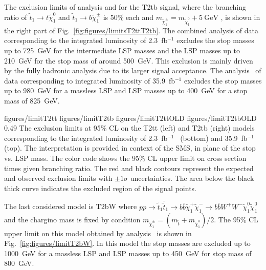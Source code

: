 The exclusion limits of analysis \cite{Sirunyan:2016jpr} and  \cite{Sirunyan:2017xse} for the T2tb signal, where the branching ratio of $ \tilde{t}_{1} \to t  \tilde{\chi}^{0}_{1} $ and $ \tilde{t}_{1} \to b  \tilde{\chi}^{\pm}_{1} $  is 50\% each and $m_{\tilde{\chi}_{1}^{\pm}} = m_{\tilde{\chi}_{1}^{0}} + 5~\mathrm{GeV}$ , is shown in the right part of Fig.~\ref{fig:figures/limitsT2ttT2tb}. The combined analysis of data corresponding to the integrated luminosity of 2.3~fb$^{-1}$ excludes the stop masses up to 725~GeV for the intermediate LSP masses and the LSP masses up to 210~GeV for the stop mass of around 500~GeV. This exclusion is mainly driven by the fully hadronic analysis due to its larger signal acceptance. The analysis~\cite{Sirunyan:2017xse} of data corresponding to integrated luminosity of 35.9~fb$^{-1}$ excludes the stop masses up to 980~GeV for a massless LSP and LSP masses up to 400~GeV for a stop mass of 825~GeV. 

                 {figures/limitT2tt} %
                 {figures/limitT2tb} %
                 {figures/limitT2ttOLD} %
                 {figures/limitT2tbOLD} %
                 {0.49}       %
                 { The exclusion limits at 95\% CL on the T2tt (left) and T2tb (right) models corresponding to the integrated luminosity of 2.3~fb$^{-1}$~\cite{Sirunyan:2016jpr} (bottom) and   35.9~fb$^{-1}$ ~\cite{Sirunyan:2017xse} (top). The interpretation is provided in context of the SMS, in plane of the stop vs. LSP mass. The color code shows the 95\% CL upper limit on cross section times given branching ratio. The red and black contours represent the expected and observed exclusion limits with $\pm 1 \sigma$ uncertainties. The area below the black thick curve indicates the excluded region of the signal points.  }

The last considered model is T2bW where $ pp \to \tilde{t}_{1} \bar{\tilde{t}}_{1} \to b \bar{b} \tilde{\chi}^{+}_{1} \tilde{\chi}^{-}_{1} \to b \bar{b} W^{+} W^{-} \tilde{\chi}^{0}_{1} \tilde{\chi}^{0}_{1}$ and the chargino mass is fixed by condition $m_{\tilde{\chi}_{1}^{\pm}} = ( m_{\tilde{t}} +  m_{\tilde{\chi}_{1}^{0}} )/2$. The 95\% CL upper limit on this model obtained by analysis~\cite{Sirunyan:2017xse} is shown in Fig.~\ref{fig:figures/limitT2bW}. In this model the stop masses are excluded up to 1000~GeV for a massless LSP and LSP masses up to 450~GeV for stop mass of 800~GeV.

